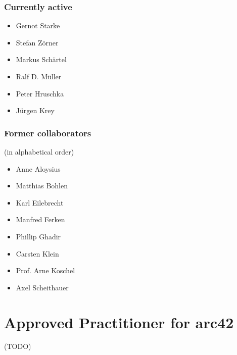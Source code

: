 \documentclass[]{article}
\begin{document}
\subsubsection{Currently active}

\begin{itemize}
\item
  Gernot Starke
\item
  Stefan Zörner
\item
  Markus Schärtel
\item
  Ralf D. Müller
\item
  Peter Hruschka
\item
  Jürgen Krey
\end{itemize}

\subsubsection{Former collaborators}

(in alphabetical order)

\begin{itemize}
\item
  Anne Aloysius
\item
  Matthias Bohlen
\item
  Karl Eilebrecht
\item
  Manfred Ferken
\item
  Phillip Ghadir
\item
  Carsten Klein
\item
  Prof. Arne Koschel
\item
  Axel Scheithauer
\end{itemize}

\section{Approved Practitioner for arc42}

(TODO)
\end{document}
